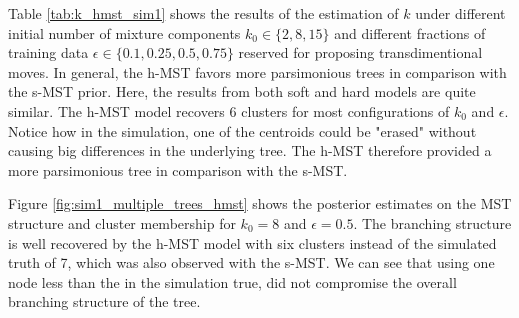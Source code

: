 Table \ref{tab:k_hmst_sim1} shows the results of the estimation of $k$ under different initial number of mixture components $k_0\in \{2,8,15\}$ and different fractions of training data $\epsilon \in\{0.1, 0.25, 0.5, 0.75\}$ reserved for proposing transdimentional moves. In general, the h-MST favors more parsimonious trees in comparison with the s-MST prior. Here, the results from both soft and hard models are quite similar. The h-MST model recovers 6 clusters for most configurations of $k_0$ and $\epsilon$. Notice how in the simulation, one of the centroids could be "erased" without causing big differences in the underlying tree. The h-MST therefore provided a more parsimonious tree in comparison with the s-MST.

Figure \ref{fig:sim1_multiple_trees_hmst} shows the posterior estimates on the MST structure and cluster membership for $k_0=8$ and $\epsilon=0.5$. The branching structure is well recovered by the h-MST model with six clusters instead of the simulated truth of 7, which was also observed with the s-MST. We can see that using one node less than the in the simulation true, did not compromise the overall branching structure of the tree.


